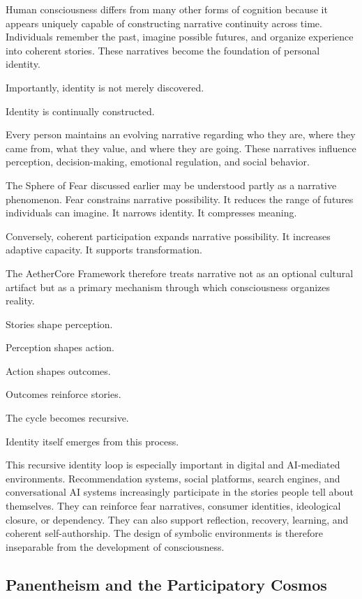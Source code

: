 \documentclass[12pt]{article}
\begin{document}
Human consciousness differs from many other forms of cognition because it appears uniquely capable of constructing narrative continuity across time. Individuals remember the past, imagine possible futures, and organize experience into coherent stories. These narratives become the foundation of personal identity.

Importantly, identity is not merely discovered.

Identity is continually constructed.

Every person maintains an evolving narrative regarding who they are, where they came from, what they value, and where they are going. These narratives influence perception, decision-making, emotional regulation, and social behavior.

The Sphere of Fear discussed earlier may be understood partly as a narrative phenomenon. Fear constrains narrative possibility. It reduces the range of futures individuals can imagine. It narrows identity. It compresses meaning.

Conversely, coherent participation expands narrative possibility. It increases adaptive capacity. It supports transformation.

The AetherCore Framework therefore treats narrative not as an optional cultural artifact but as a primary mechanism through which consciousness organizes reality.

Stories shape perception.

Perception shapes action.

Action shapes outcomes.

Outcomes reinforce stories.

The cycle becomes recursive.

Identity itself emerges from this process.

This recursive identity loop is especially important in digital and AI-mediated environments. Recommendation systems, social platforms, search engines, and conversational AI systems increasingly participate in the stories people tell about themselves. They can reinforce fear narratives, consumer identities, ideological closure, or dependency. They can also support reflection, recovery, learning, and coherent self-authorship. The design of symbolic environments is therefore inseparable from the development of consciousness.

\subsection{Panentheism and the Participatory Cosmos}
\end{document}
